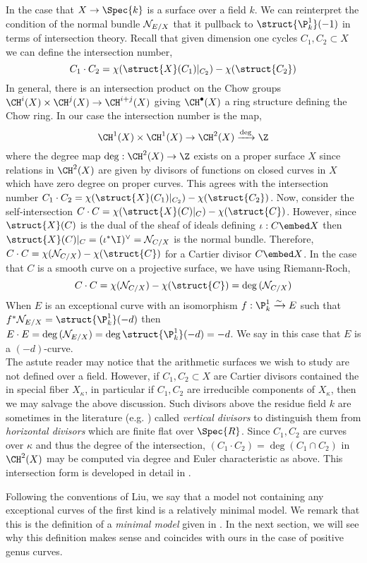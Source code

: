 \begin{rmk}
In the case that $X \to \Spec{k}$ is a surface over a field $k$. We can reinterpret the condition of the normal bundle $\mathcal{N}_{E/X}$ that it pullback to $\struct{\P^1_k}(-1)$ in terms of intersection theory. Recall that given dimension one cycles $C_1, C_2 \subset X$ we can define the intersection number,
\[ C_1 \cdot C_2 = \chi(\struct{X}(C_1)|_{C_2}) - \chi(\struct{C_2}) \]
In general, there is an intersection product on the Chow groups $\CH^i(X) \times \CH^j(X) \to \CH^{i+j}(X)$ giving $\CH^\bullet(X)$ a ring structure defining the Chow ring. In our case the intersection number is the map,
\[ \CH^{1}(X) \times \CH^{1}(X) \to \CH^2(X) \xrightarrow{\deg} \Z \]
where the degree map $\deg : \CH^2(X) \to \Z$ exists on a proper surface $X$ since relations in $\CH^2(X)$ are given by divisors of functions on closed curves in $X$ which have zero degree on proper curves. This agrees with the intersection number $C_1 \cdot C_2 = \chi(\struct{X}(C_1)|_{C_2}) - \chi(\struct{C_2})$. Now, consider the self-intersection $C \cdot C = \chi(\struct{X}(C)|_C) - \chi(\struct{C})$. However, since $\struct{X}(C)$ is the dual of the sheaf of ideals defining $\iota : C \embed X$ then $\struct{X}(C)|_C = (\iota^* \I)^\vee = \N_{C/X}$ is the normal bundle. Therefore, $C \cdot C = \chi(\N_{C/X}) - \chi(\struct{C})$ for a Cartier divisor $C \embed X$. In the case that $C$ is a smooth curve on a projective surface, we have using Riemann-Roch,
\[ C \cdot C = \chi(\N_{C/X}) - \chi(\struct{C}) = \deg{(\N_{C/X})} \]
When $E$ is an exceptional curve with an isomorphism $f : \P^1_k \xrightarrow{\sim} E$ such that $f^* \N_{E/X} = \struct{\P^1_k}(-d)$ then $E \cdot E = \deg{(\N_{E/X})} = \deg{\struct{\P^1_k}(-d)} = -d$. We say in this case that $E$ is a $(-d)$-curve. 
\bigskip\\
The astute reader may notice that the arithmetic surfaces we wish to study are not defined over a field. However, if $C_1, C_2 \subset X$ are Cartier divisors contained the in special fiber $X_\kappa$, in particular if $C_1, C_2$ are irreducible components of $X_\kappa$, then we may salvage the above discussion. Such divisors above the residue field $k$ are sometimes in the literature (e.g. \cite{romagny_models}) called \textit{vertical divisors} to distinguish them from \textit{horizontal divisors} which are finite flat over $\Spec{R}$. Since $C_1, C_2$ are curves over $\kappa$ and thus the degree of the intersection, $(C_1 \cdot C_2) = \deg{(C_1 \cap C_2)}$ in $\CH^2(X)$ may be computed via degree and Euler characteristic as above. This intersection form is developed in detail in \cite[\href{https://stacks.math.columbia.edu/tag/0C5Y}{Tag 0C5Y}]{stacks-project}.
\end{rmk}
\noindent
Following the conventions of Liu, we say that a model not containing any exceptional curves of the first kind is a relatively minimal model. We remark that this is the definition of a \textit{minimal model} given in \cite[\href{https://stacks.math.columbia.edu/tag/0C2R}{Tag 0C2R}]{stacks-project}. In the next section, we will see why this definition makes sense and coincides with ours in the case of positive genus curves.

